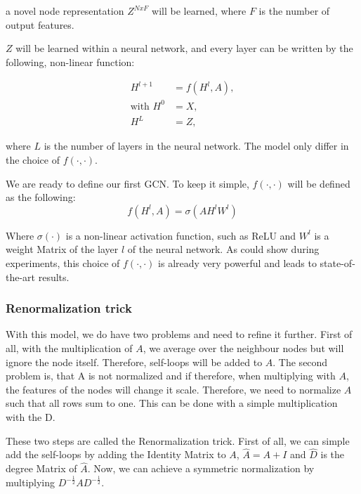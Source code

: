 a novel node representation $Z^{N x F}$ will be learned, where $F$ is the number of output features.

$Z$ will be learned within a neural network, and every layer can be written by the following, non-linear function:

\begin{equation}
    \begin{aligned}
        H^{l + 1} &= f( H^l, A), \\
        \text{with } H^0 &= X , \\
        H^L &= Z, 
    \end{aligned}
\end{equation}

where $L$ is the number of layers in the neural network.
The model only differ in the choice of $f(\cdot,\cdot)$.

We are ready to define our first GCN. To keep it simple, $f(\cdot,\cdot)$ will be defined as the following:
\begin{equation}
    f( H^l, A) = \sigma (A H^l W^l)
\end{equation} 

Where $\sigma ( \cdot )$ is a non-linear activation function, such as ReLU and $W^l$ is
a weight Matrix of the layer $l$ of the neural network. As \citet{GCN} could show during experiments,
this choice of $f(\cdot,\cdot)$ is already very powerful and leads to state-of-the-art results.

\subsubsection{Renormalization trick}

With this model, we do have two problems and need to refine it further.
First of all, with the multiplication of $A$, we average over the neighbour nodes but
will ignore the node itself. Therefore, self-loops will be added to $A$.
The second problem is, that A is not normalized and if therefore, when multiplying with $A$,
the features of the nodes will change it scale. Therefore, we need to normalize $A$
such that all rows sum to one. This can be done with a simple multiplication with the D.

These two steps are called the Renormalization trick\cite{GCN}.
First of all, we can simple add the self-loops by adding the Identity Matrix to $A$, 
$\hat{A} = A + I$ and $\hat{D}$ is the degree Matrix of $\hat{A}$.
Now, we can achieve a symmetric normalization by multiplying $D^{-\frac{1}{2}} A D^{-\frac{1}{2}}$.

